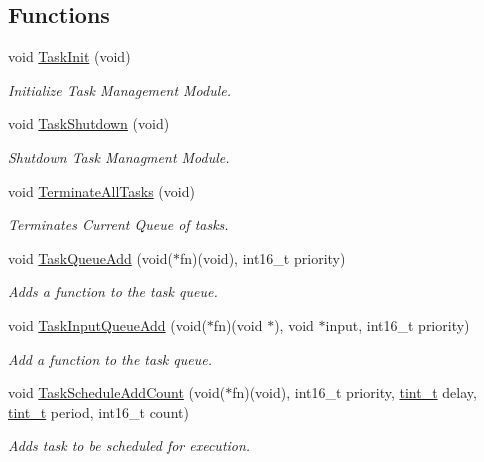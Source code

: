 \subsection*{Functions}
\begin{DoxyCompactItemize}
\item 
void \hyperlink{group__task_ga9e45f9614898df9d3f9ce6125a51cd76}{Task\+Init} (void)
\begin{DoxyCompactList}\small\item\em Initialize Task Management Module. \end{DoxyCompactList}\item 
void \hyperlink{group__task_gac7895d51adab1e77f320e387b28a58e6}{Task\+Shutdown} (void)
\begin{DoxyCompactList}\small\item\em Shutdown Task Managment Module. \end{DoxyCompactList}\item 
void \hyperlink{group__task_gaf8e57408c18da97569bf0faab543c71c}{Terminate\+All\+Tasks} (void)
\begin{DoxyCompactList}\small\item\em Terminates Current Queue of tasks. \end{DoxyCompactList}\item 
void \hyperlink{group__task_ga8199744ecf98f4adfc5c132b82f7bca0}{Task\+Queue\+Add} (void($\ast$fn)(void), int16\+\_\+t priority)
\begin{DoxyCompactList}\small\item\em Adds a function to the task queue. \end{DoxyCompactList}\item 
void \hyperlink{group__task_gaa4809ac3424d1e4e2e57718b596b4ae5}{Task\+Input\+Queue\+Add} (void($\ast$fn)(void $\ast$), void $\ast$input, int16\+\_\+t priority)
\begin{DoxyCompactList}\small\item\em Add a function to the task queue. \end{DoxyCompactList}\item 
void \hyperlink{group__task_gaf9635b62e4d6c222224ee274e9ae89f7}{Task\+Schedule\+Add\+Count} (void($\ast$fn)(void), int16\+\_\+t priority, \hyperlink{group__timing_gaef97c9386393beb1be4ed0b1513ee481}{tint\+\_\+t} delay, \hyperlink{group__timing_gaef97c9386393beb1be4ed0b1513ee481}{tint\+\_\+t} period, int16\+\_\+t count)
\begin{DoxyCompactList}\small\item\em Adds task to be scheduled for execution. \end{DoxyCompactList}\item 

\end{DoxyCompactItemize}
